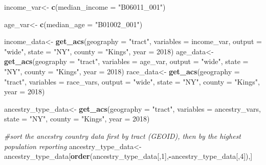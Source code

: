 \documentclass[
]{article}
\newenvironment{Shaded}{\begin{snugshade}}{\end{snugshade}}
\newcommand{\CommentTok}[1]{\textcolor[rgb]{0.56,0.35,0.01}{\textit{#1}}}
\newcommand{\DataTypeTok}[1]{\textcolor[rgb]{0.13,0.29,0.53}{#1}}
\newcommand{\DecValTok}[1]{\textcolor[rgb]{0.00,0.00,0.81}{#1}}
\newcommand{\KeywordTok}[1]{\textcolor[rgb]{0.13,0.29,0.53}{\textbf{#1}}}
\newcommand{\NormalTok}[1]{#1}
\newcommand{\OperatorTok}[1]{\textcolor[rgb]{0.81,0.36,0.00}{\textbf{#1}}}
\newcommand{\StringTok}[1]{\textcolor[rgb]{0.31,0.60,0.02}{#1}}
\begin{document}
\begin{Shaded}
\begin{Highlighting}[]
\NormalTok{income_var<-}\StringTok{ }\KeywordTok{c}\NormalTok{(}\DataTypeTok{median_income =} \StringTok{"B06011_001"}\NormalTok{)}

\NormalTok{age_var<-}\StringTok{ }\KeywordTok{c}\NormalTok{(}\DataTypeTok{median_age =} \StringTok{"B01002_001"}\NormalTok{)}


\NormalTok{income_data<-}\StringTok{ }\KeywordTok{get_acs}\NormalTok{(}\DataTypeTok{geography =} \StringTok{"tract"}\NormalTok{,}
                   \DataTypeTok{variables =}\NormalTok{ income_var,}
                   \DataTypeTok{output =} \StringTok{"wide"}\NormalTok{,}
                   \DataTypeTok{state =} \StringTok{"NY"}\NormalTok{,}
                   \DataTypeTok{county =} \StringTok{"Kings"}\NormalTok{,}
                   \DataTypeTok{year =} \DecValTok{2018}\NormalTok{)}
\NormalTok{age_data<-}\StringTok{ }\KeywordTok{get_acs}\NormalTok{(}\DataTypeTok{geography =} \StringTok{"tract"}\NormalTok{,}
                   \DataTypeTok{variables =}\NormalTok{ age_var,}
                   \DataTypeTok{output =} \StringTok{"wide"}\NormalTok{,}
                   \DataTypeTok{state =} \StringTok{"NY"}\NormalTok{,}
                   \DataTypeTok{county =} \StringTok{"Kings"}\NormalTok{,}
                   \DataTypeTok{year =} \DecValTok{2018}\NormalTok{)}
\NormalTok{race_data<-}\StringTok{ }\KeywordTok{get_acs}\NormalTok{(}\DataTypeTok{geography =} \StringTok{"tract"}\NormalTok{, }
                    \DataTypeTok{variables =}\NormalTok{ race_vars,}
                    \DataTypeTok{output =} \StringTok{"wide"}\NormalTok{,}
                    \DataTypeTok{state =} \StringTok{"NY"}\NormalTok{, }
                    \DataTypeTok{county =} \StringTok{"Kings"}\NormalTok{, }
                    \DataTypeTok{year =} \DecValTok{2018}\NormalTok{)}

\NormalTok{ancestry_type_data<-}\StringTok{ }\KeywordTok{get_acs}\NormalTok{(}\DataTypeTok{geography =} \StringTok{"tract"}\NormalTok{,}
                             \DataTypeTok{variables =}\NormalTok{ ancestry_vars,}
                             \DataTypeTok{state =} \StringTok{"NY"}\NormalTok{,}
                             \DataTypeTok{county =} \StringTok{"Kings"}\NormalTok{,}
                             \DataTypeTok{year =} \DecValTok{2018}\NormalTok{)}
  
\CommentTok{#sort the ancestry country data first by tract (GEOID), then by the highest population reporting}
\NormalTok{ancestry_type_data<-}\StringTok{ }\NormalTok{ancestry_type_data[}\KeywordTok{order}\NormalTok{(ancestry_type_data[,}\DecValTok{1}\NormalTok{],}\OperatorTok{-}\NormalTok{ancestry_type_data[,}\DecValTok{4}\NormalTok{]),]}


\end{Highlighting}
\end{Shaded}
\end{document}
